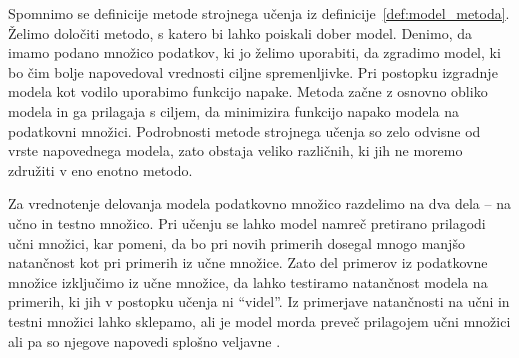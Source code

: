 \documentclass[12pt,a4paper,twoside]{article}
\theoremstyle{definition} %
\theoremstyle{plain} %
\numberwithin{equation}{section}  %
\begin{document}



Spomnimo se definicije metode strojnega učenja iz definicije~\ref{def:model_metoda}.
Želimo določiti metodo, s katero bi lahko poiskali dober model.
Denimo, da imamo podano množico podatkov, ki jo želimo uporabiti, da zgradimo model, ki bo čim bolje napovedoval vrednosti ciljne spremenljivke.
Pri postopku izgradnje modela kot vodilo uporabimo funkcijo napake.
Metoda začne z osnovno obliko modela in ga prilagaja s ciljem, da minimizira funkcijo napako modela na podatkovni množici.
Podrobnosti metode strojnega učenja so zelo odvisne od vrste napovednega modela, zato obstaja veliko različnih, ki jih ne moremo združiti v eno enotno metodo.

Za vrednotenje delovanja modela podatkovno množico razdelimo na dva dela -- na učno in testno množico.
Pri učenju se lahko model namreč pretirano prilagodi učni množici, kar pomeni, da bo pri novih primerih dosegal mnogo manjšo natančnost kot pri primerih iz učne množice.
Zato del primerov iz podatkovne množice izključimo iz učne množice, da lahko testiramo natančnost modela na primerih, ki jih v postopku učenja ni ``videl''.
Iz primerjave natančnosti na učni in testni množici lahko sklepamo, ali je model morda preveč prilagojem učni množici ali pa so njegove napovedi splošno veljavne .

\end{document}
